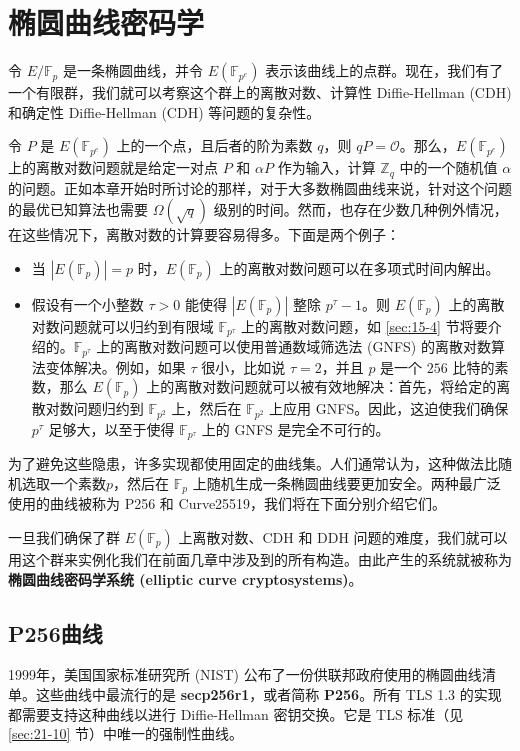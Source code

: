 \section{椭圆曲线密码学}\label{sec:15-3}

令 $E/\mathbb{F}_p$ 是一条椭圆曲线，并令 $E(\mathbb{F}_{p^e})$ 表示该曲线上的点群。现在，我们有了一个有限群，我们就可以考察这个群上的离散对数、计算性 Diffie-Hellman (CDH) 和确定性 Diffie-Hellman (CDH) 等问题的复杂性。

令 $P$ 是 $E(\mathbb{F}_{p^e})$ 上的一个点，且后者的阶为素数 $q$，则 $qP=\mathcal{O}$。那么，$E(\mathbb{F}_{p^e})$ 上的离散对数问题就是给定一对点 $P$ 和 $\alpha P$ 作为输入，计算 $\mathbb{Z}_q$ 中的一个随机值 $\alpha$ 的问题。正如本章开始时所讨论的那样，对于大多数椭圆曲线来说，针对这个问题的最优已知算法也需要 $\Omega(\sqrt{q})$ 级别的时间。然而，也存在少数几种例外情况，在这些情况下，离散对数的计算要容易得多。下面是两个例子：
\begin{itemize}
	\item 当 $|E(\mathbb{F}_p)|=p$ 时，$E(\mathbb{F}_p)$ 上的离散对数问题可以在多项式时间内解出。
	\item 假设有一个小整数 $\tau>0$ 能使得 $|E(\mathbb{F}_p)|$ 整除 $p^{\tau}-1$。则 $E(\mathbb{F}_p)$ 上的离散对数问题就可以归约到有限域 $\mathbb{F}_{p^\tau}$ 上的离散对数问题，如 \ref{sec:15-4} 节将要介绍的。$\mathbb{F}_{p^\tau}$ 上的离散对数问题可以使用普通数域筛选法 (GNFS) 的离散对数算法变体解决。例如，如果 $\tau$ 很小，比如说 $\tau=2$，并且 $p$ 是一个 $256$ 比特的素数，那么 $E(\mathbb{F}_p)$ 上的离散对数问题就可以被有效地解决：首先，将给定的离散对数问题归约到 $\mathbb{F}_{p^2}$ 上，然后在 $\mathbb{F}_{p^2}$ 上应用 GNFS。因此，这迫使我们确保 $p^\tau$ 足够大，以至于使得 $\mathbb{F}_{p^\tau}$ 上的 GNFS 是完全不可行的。
\end{itemize}
为了避免这些隐患，许多实现都使用固定的曲线集。人们通常认为，这种做法比随机选取一个素数$p$，然后在 $\mathbb{F}_{p}$ 上随机生成一条椭圆曲线要更加安全。两种最广泛使用的曲线被称为 P256 和 Curve25519，我们将在下面分别介绍它们。

一旦我们确保了群 $E(\mathbb{F}_{p})$ 上离散对数、CDH 和 DDH 问题的难度，我们就可以用这个群来实例化我们在前面几章中涉及到的所有构造。由此产生的系统就被称为\textbf{椭圆曲线密码学系统 (elliptic curve cryptosystems)}。

\subsection{P256曲线}

1999年，美国国家标准研究所 (NIST) 公布了一份供联邦政府使用的椭圆曲线清单。这些曲线中最流行的是 \textbf{secp256r1}，或者简称 \textbf{P256}。所有 TLS 1.3 的实现都需要支持这种曲线以进行 Diffie-Hellman 密钥交换。它是 TLS 标准（见 \ref{sec:21-10} 节）中唯一的强制性曲线。

